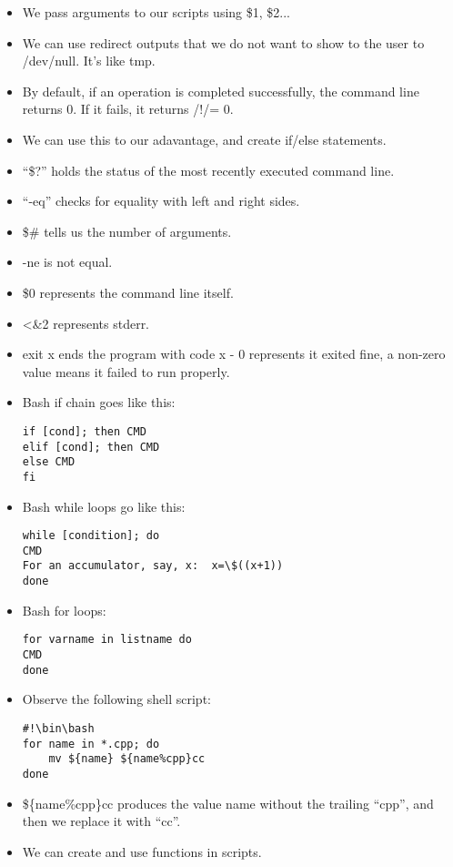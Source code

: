 \documentclass{article}
\begin{document}
\begin{itemize}
\item We pass arguments to our scripts using \$1, \$2... 
\item We can use redirect outputs that we do not want to show to the user to /dev/null.  It's like tmp.
\item By default, if an operation is completed successfully, the command line returns 0.  If it fails, it returns /!/= 0.
\item We can use this to our adavantage, and create if/else statements.
\item ``\$?'' holds the status of the most recently executed command line.
\item ``-eq'' checks for equality with left and right sides.
\item \${\#} tells us the number of arguments.
\item -ne is not equal.
\item \$0 represents the command line itself.
\item \textless \&2 represents stderr.
\item exit x ends the program with code x - 0 represents it exited fine, a non-zero value means it failed to run properly.
\item Bash if chain goes like this:
\begin{lstlisting}
if [cond]; then CMD
elif [cond]; then CMD
else CMD
fi
\end{lstlisting}
\item Bash while loops go like this:
\begin{lstlisting}
while [condition]; do
CMD
For an accumulator, say, x:  x=\$((x+1))
done
\end{lstlisting}
\item Bash for loops:
\begin{lstlisting}
for varname in listname do
CMD
done
\end{lstlisting}
\item Observe the following shell script:
\begin{lstlisting}
#!\bin\bash
for name in *.cpp; do
    mv ${name} ${name%cpp}cc
done
\end{lstlisting}
\item \$\{name\%cpp\}cc produces the value name without the trailing ``cpp'', and then we replace it with ``cc''.
\item We can create and use functions in scripts.
\end{itemize}
\end{document}
